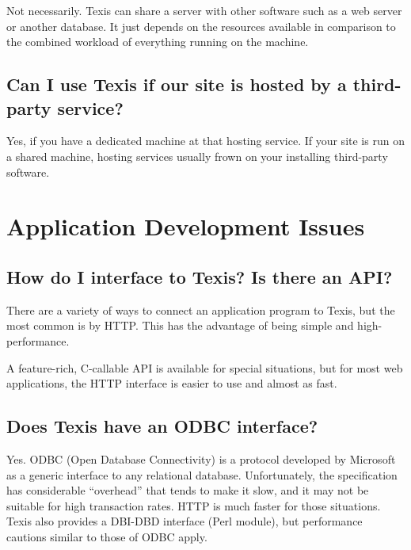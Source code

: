 Not necessarily. Texis can share a server with other software such as
a web server or another database. It just depends on the resources
available in comparison to the combined workload of everything running
on the machine.

\section{Can I use Texis if our site is hosted by a third-party service? }

Yes, if you have a dedicated machine at that hosting service. If your
site is run on a shared machine, hosting services usually frown on
your installing third-party software.

\chapter{Application Development Issues}

\section{How do I interface to Texis? Is there an API? }

There are a variety of ways to connect an application program to
Texis, but the most common is by HTTP.  This has the advantage of
being simple and high-performance.

A feature-rich, C-callable API is available for special situations,
but for most web applications, the HTTP interface is easier to use and
almost as fast.

\section{Does Texis have an ODBC interface? }

Yes. ODBC (Open Database Connectivity) is a protocol developed by
Microsoft as a generic interface to any relational database.
Unfortunately, the specification has considerable ``overhead'' that
tends to make it slow, and it may not be suitable for high transaction
rates. HTTP is much faster for those situations.  Texis also provides
a DBI-DBD interface (Perl module), but performance cautions similar to
those of ODBC apply.

